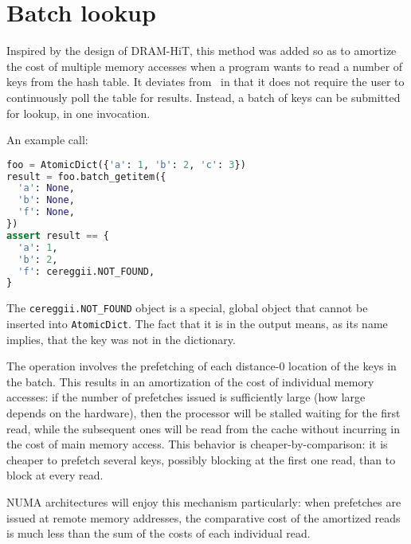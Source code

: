 \section{Batch lookup}\label{sec:batch-lookup}

Inspired by the design of DRAM-HiT, this method was added so as to amortize the cost of multiple memory accesses when a program wants to read a number of keys from the hash table.
It deviates from~\cite{dramhit} in that it does not require the user to continuously poll the table for results.
Instead, a batch of keys can be submitted for lookup, in one invocation.

An example call:

\begin{lstlisting}[language=Python,label={lst:batch-lookup-usage}]
foo = AtomicDict({'a': 1, 'b': 2, 'c': 3})
result = foo.batch_getitem({
  'a': None,
  'b': None,
  'f': None,
})
assert result == {
  'a': 1,
  'b': 2,
  'f': cereggii.NOT_FOUND,
}
\end{lstlisting}

The \texttt{cereggii.NOT\_FOUND} object is a special, global object that cannot be inserted into \texttt{AtomicDict}.
The fact that it is in the output means, as its name implies, that the key was not in the dictionary.

The operation involves the prefetching of each distance-0 location of the keys in the batch.
This results in an amortization of the cost of individual memory accesses: if the number of prefetches issued is sufficiently large (how large depends on the hardware), then the processor will be stalled waiting for the first read, while the subsequent ones will be read from the cache without incurring in the cost of main memory access.
This behavior is cheaper-by-comparison: it is cheaper to prefetch several keys, possibly blocking at the first one read, than to block at every read.

NUMA architectures will enjoy this mechanism particularly: when prefetches are issued at remote memory addresses, the comparative cost of the amortized reads is much less than the sum of the costs of each individual read.

